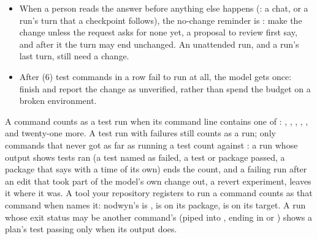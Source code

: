 \begin{itemize}
    input or case, answered as one line for each row, the row and a sentence
    copied word for word from the request; if none does, restore it and change
    the code (). The edit is never refused, a test
    the turn added is not asked about, and each file is asked about once in
    a turn. The loop reads the reply that follows (,
    ): a quote is a run of three words or more of the
    reply that stands in the request, and supports a row when it shares a
    distinctive word with the row's string literals and with the line that
    replaces it; a phrase made shorter needs most of the words cut, a phrase
    split all of the words put. A row not supported gets one firmer message
    (), and the finish review lists it
    first.

    not asked again. In a run nobody reads as it goes it is made at most
    twice over the run's turns (). A test step
    may name a scenario file, a path through a ,
     or  folder, which a file the turn wrote
    or the repository has meets, with a  run of the folder
    above it.
  \item When a person reads the answer before anything else happens
    (: a chat, or a run's turn that a checkpoint follows),
    the no-change reminder is : make
    the change unless the request asks for none yet, a proposal to review
    first say, and after it the turn may end unchanged. An unattended run,
    and a run's last turn, still need a change.
  \item After  (6) test commands in a row fail to run
    at all, the model gets  once: finish
    and report the change as unverified, rather than spend the budget on a
    broken environment.
\end{itemize}

A command counts as a test run when its command line contains one of
: , ,
, , ,  and
twenty-one more. A test run with failures still counts as a run; only
commands that never got as far as running a test count against
: a run whose output shows tests ran (a test named as
failed, a test or package passed, a package that says  with a time
of its own) ends the count, and a failing run after an edit that took part of
the model's own change out, a revert experiment, leaves it where it was. A tool your repository registers to run a command
counts as that command when  names it: nodwyn's
 is ,  is 
on its package,  is  on its target. A run whose
exit status may be another command's (piped into , ending in
 or ) shows a plan's test passing only
when its output does.

